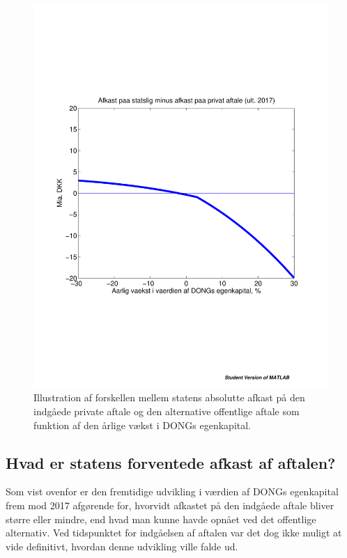 \documentclass{article}
\begin{document}
\begin{figure}
\includegraphics[scale=0.8, trim=0mm 0mm 0mm 0mm]{../matlab/figs/private_less_public_deal.pdf}
\caption{Illustration af forskellen mellem statens absolutte afkast p\aa{} den indg\aa{}ede private aftale og den alternative offentlige aftale som funktion af den \aa{}rlige v\ae{}kst i DONGs egenkapital. }
\label{fig:comp}
\end{figure}


\subsection{Hvad er statens forventede afkast af aftalen?}

Som vist ovenfor er den fremtidige udvikling i værdien af DONGs egenkapital frem mod 2017 afgørende for, hvorvidt afkastet på den indgåede aftale bliver større eller mindre, end hvad man kunne havde opnået ved det offentlige alternativ. Ved tidspunktet for indgåelsen af aftalen var det dog ikke muligt at vide definitivt, hvordan denne udvikling ville falde ud. 
\end{document}
